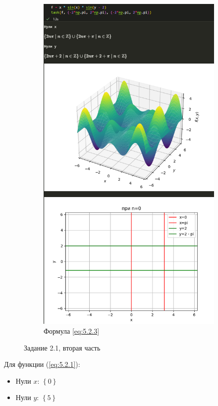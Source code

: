 \documentclass[14pt,a4paper]{extarticle}
\begin{document}
\begin{figure}
\begin{subfigure}{0.48\linewidth}
        \includegraphics[width=0.95\linewidth]{figures/5.2/1.3.png}
        \caption{Формула \ref{eq:5.2.3}}
        \label{pic:5.2.3}
    \end{subfigure}
    \caption{Задание 2.1, вторая часть}
\end{figure}

Для функции (\ref{eq:5.2.1}):
\begin{itemize}
    \item Нули $x$:
    $\displaystyle \left\{0\right\}$
    \item Нули $y$:
    $\displaystyle \left\{5\right\}$
\end{itemize}
\end{document}
